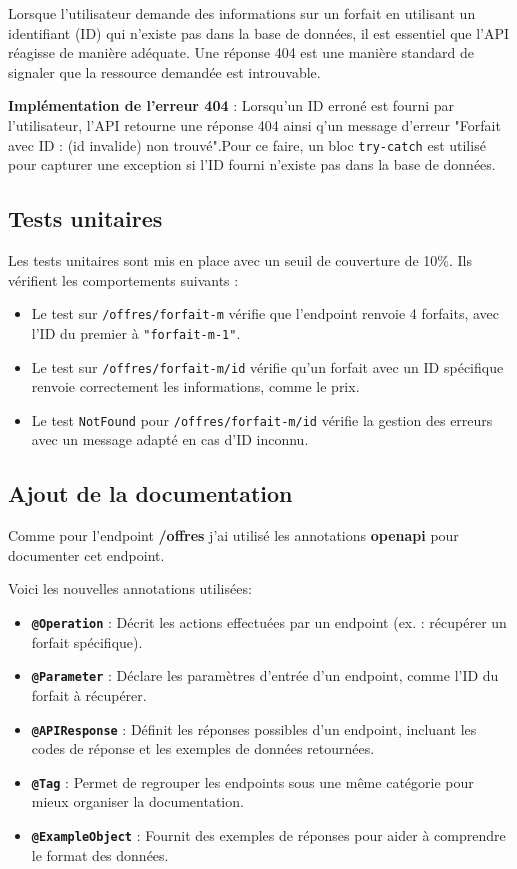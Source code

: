 \documentclass[11pt]{article}
\begin{document}
		Lorsque l'utilisateur demande des informations sur un forfait en utilisant un identifiant (ID) qui n'existe pas dans la base de données, il est essentiel que l'API réagisse de manière adéquate. Une réponse 404 est une manière standard de signaler que la ressource demandée est introuvable. 
		
		\textbf{Implémentation de l'erreur 404} : 
		Lorsqu'un ID erroné est fourni par l'utilisateur, l'API retourne une réponse 404 ainsi q'un message d'erreur "Forfait avec ID : (id invalide) non trouvé".Pour ce faire, un bloc \texttt{try-catch} est utilisé pour capturer une exception si l'ID fourni n'existe pas dans la base de données.
	
		
		\subsection*{Tests unitaires}
		\label{subsec:tests}
		
		Les tests unitaires sont mis en place avec un seuil de couverture de 10\%. Ils vérifient les comportements suivants :
		
		\begin{itemize}
			\item Le test sur \texttt{/offres/forfait-m} vérifie que l'endpoint renvoie 4 forfaits, avec l'ID du premier à \texttt{"forfait-m-1"}.
			\item Le test sur \texttt{/offres/forfait-m/{id}} vérifie qu'un forfait avec un ID spécifique renvoie correctement les informations, comme le prix.
			\item Le test \texttt{NotFound} pour \texttt{/offres/forfait-m/{id}} vérifie la gestion des erreurs avec un message adapté en cas d'ID inconnu.
		\end{itemize}
	
		\subsection*{Ajout de la documentation}
		\label{subsec:doc}
		
		Comme pour l'endpoint \textbf{/offres} j'ai utilisé les annotations \textbf{openapi} pour documenter cet endpoint.
		
		Voici les nouvelles annotations utilisées:
		
		\begin{itemize}
			\item \textbf{\texttt{@Operation}} : Décrit les actions effectuées par un endpoint (ex. : récupérer un forfait spécifique).
			\item \textbf{\texttt{@Parameter}} : Déclare les paramètres d'entrée d'un endpoint, comme l'ID du forfait à récupérer.
			\item \textbf{\texttt{@APIResponse}} : Définit les réponses possibles d'un endpoint, incluant les codes de réponse et les exemples de données retournées.
			\item \textbf{\texttt{@Tag}} : Permet de regrouper les endpoints sous une même catégorie pour mieux organiser la documentation.
			\item \textbf{\texttt{@ExampleObject}} : Fournit des exemples de réponses pour aider à comprendre le format des données.
		\end{itemize}
		
\end{document}
